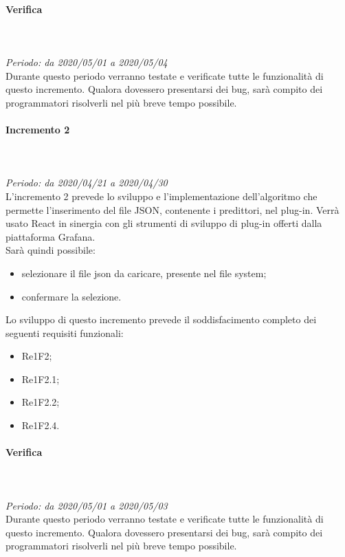 \paragraph*{Verifica}\mbox{} \\ \mbox{} \\ 
\textit{Periodo: da 2020/05/01 a 2020/05/04}\\
Durante questo periodo verranno testate e verificate tutte le funzionalità di questo incremento. Qualora dovessero presentarsi dei bug\glo, sarà compito dei programmatori risolverli nel più breve tempo possibile.

\paragraph{Incremento 2}\mbox{} \\ \mbox{} \\ 
\textit{Periodo: da 2020/04/21 a 2020/04/30}\\
L’incremento 2 prevede lo sviluppo e l’implementazione dell'algoritmo che permette l'inserimento del file JSON, contenente i predittori, nel plug-in. Verrà usato React in sinergia con gli strumenti di sviluppo di plug-in offerti dalla piattaforma Grafana. \\
Sarà quindi possibile:
\begin{itemize}
	\item selezionare il file json da caricare, presente nel file system;
	\item confermare la selezione.
\end{itemize}
Lo sviluppo di questo incremento prevede il soddisfacimento completo dei seguenti requisiti funzionali:
\begin{itemize}
\item Re1F2;
\item Re1F2.1;
\item Re1F2.2;
\item Re1F2.4.
\end{itemize}
\paragraph*{Verifica}\mbox{} \\ \mbox{} \\ 
\textit{Periodo: da 2020/05/01 a 2020/05/03}\\
Durante questo periodo verranno testate e verificate tutte le funzionalità di questo incremento. Qualora dovessero presentarsi dei bug, sarà compito dei programmatori risolverli nel più breve tempo possibile.

